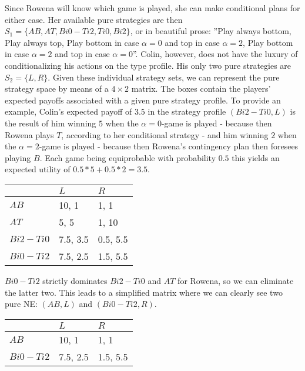 \documentclass[10pt,a4paper]{article}
\begin{document}
Since Rowena will know which game is played, she can make conditional plans for either case. Her available pure strategies are then $S_1=\{AB,AT,Bi0-Ti2,Ti0,Bi2\}$, or in beautiful prose: ''Play always bottom, Play always top, Play bottom in case $\alpha=0$ and top in case $\alpha=2$, Play bottom in case $\alpha=2$ and top in case $\alpha=0$''. Colin, however, does not have the luxury of conditionalizing his actions on the type profile. His only two pure strategies are $S_2=\{L,R\}$. Given these individual strategy sets, we can represent the pure strategy space by means of a $4\times 2$ matrix. The boxes contain the players' expected payoffs associated with a given pure strategy profile. To provide an example, Colin's expected payoff of $3.5$ in the strategy profile $(Bi2-Ti0,L)$ is the result of him winning $5$ when the $\alpha=0$-game is played - because then Rowena plays $T$, according to her conditional strategy - and him winning $2$ when the $\alpha=2$-game is played - because then Rowena's contingency plan then foresees playing $B$. Each game being equiprobable with probability $0.5$ this yields an expected utility of $0.5*5+0.5*2=3.5$.
\begin{table}[h]
\centering
\begin{tabular}[l]{|l|l|l|}
\hline
          & $L$ & $R$  \\ \hline
$AB$     & 10, 1   & 1, 1 \\ \hline
$AT$		& 5, 5	& 1, 10 \\ \hline
$Bi2-Ti0$	& 7.5, 3.5 & 0.5, 5.5 \\ \hline
$Bi0-Ti2$	& 7.5, 2.5	& 1.5, 5.5 \\ \hline
\end{tabular}
\end{table}
$Bi0-Ti2$ strictly dominates $Bi2-Ti0$ and $AT$ for Rowena, so we can eliminate the latter two. This leads to a simplified matrix where we can clearly see two pure NE: $(AB,L)$ and $(Bi0-Ti2,R)$.
\begin{table}[h]
\centering
\begin{tabular}[l]{|l|l|l|}
\hline
          & $L$ & $R$  \\ \hline
$AB$     & 10, 1   & 1, 1 \\ \hline
$Bi0-Ti2$	& 7.5, 2.5	& 1.5, 5.5 \\ \hline
\end{tabular}
\end{table}
\end{document}
